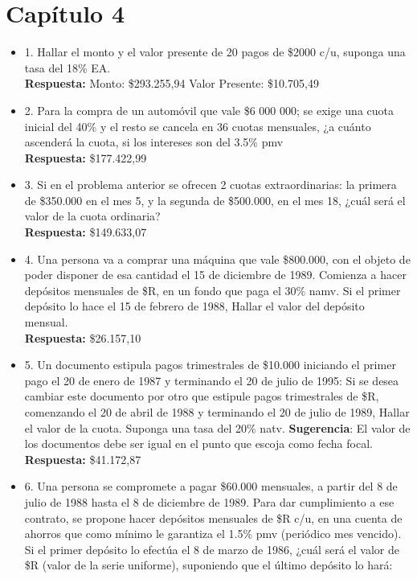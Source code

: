 

\chapter*{Capítulo 4}


\begin{itemize}
	
	\item 1. Hallar el monto y el valor presente de 20 pagos de \$2000 c/u, suponga una tasa del 18\% EA.\\
	\textbf{Respuesta:} Monto: \$293.255,94 \hspace{1,5cm} Valor Presente: \$10.705,49\\
	\medskip
	\item 2. Para la compra de un automóvil que vale \$6 000 000; se exige una cuota inicial del 40\% y el resto se cancela en 36 cuotas mensuales, ¿a cuánto ascenderá la cuota, si los intereses son del 3.5\% pmv\\
	\textbf{Respuesta:} \$177.422,99\\
	\medskip
	\item 3. Si en el problema anterior se ofrecen 2 cuotas extraordinarias: la primera de
	\$350.000 en el mes 5, y la segunda de \$500.000, en el mes 18, ¿cuál será el valor de la cuota ordinaria?\\
	\textbf{Respuesta:} \$149.633,07\\
	\medskip
	\item 4. Una persona va a comprar una máquina que vale \$800.000, con el objeto de poder disponer de esa cantidad el 15 de diciembre de 1989. Comienza a hacer depósitos mensuales de \$R, en un fondo que paga el 30\% namv. Si el primer depósito lo hace el 15 de febrero de 1988, Hallar el valor del depósito mensual.\\
	\textbf{Respuesta:} \$26.157,10\\
	\medskip
	\item 5. Un documento estipula pagos trimestrales de \$10.000 iniciando el primer pago el 20 de enero de 1987 y terminando el 20 de julio de 1995: Si se desea cambiar este documento por otro que estipule pagos trimestrales de \$R, comenzando el 20 de abril de 1988 y terminando el 20 de julio de 1989, Hallar el valor de la cuota. Suponga una tasa del 20\% natv. \textbf{Sugerencia}: El valor de los documentos debe ser igual en el punto que escoja como fecha focal.\\
	\textbf{Respuesta:} \$41.172,87\\
	\medskip
	\item 6. Una persona se compromete a pagar \$60.000 mensuales, a partir del 8 de julio de 1988 hasta el 8 de diciembre de 1989. Para dar cumplimiento a ese contrato, se propone hacer depósitos mensuales de \$R c/u, en una cuenta de ahorros que como mínimo le garantiza el 1.5\% pmv (periódico mes vencido). Si el primer depósito lo efectúa el 8 de marzo de 1986, ¿cuál será el valor de \$R (valor de la serie uniforme), suponiendo que el último depósito lo hará:\\
	

\end{itemize}
